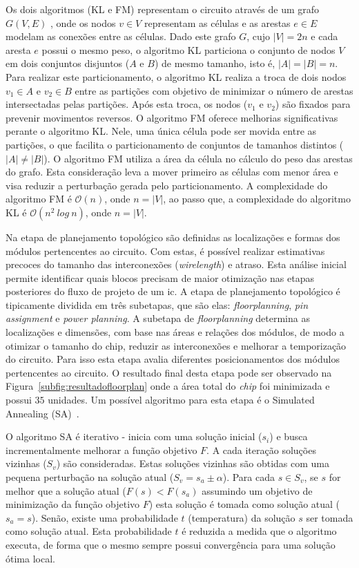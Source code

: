 Os dois algoritmos (KL e FM) representam o circuito através de um grafo $G(V, E)$ , onde os nodos $v \in V$ representam as células e as arestas $e \in E$ modelam as conexões entre as células. Dado este grafo $G$, cujo $|V| = 2n$ e cada aresta $e$ possui o mesmo peso, o algoritmo KL particiona o conjunto de nodos $V$ em dois conjuntos disjuntos ($A$ e $B$) de mesmo tamanho, isto é, $|A| = |B| = n$.
Para realizar este particionamento, o algoritmo KL realiza a troca de dois nodos $v_1 \in A$ e $v_2 \in B$ entre as partições com objetivo de minimizar o número de arestas intersectadas pelas partições. Após esta troca, os nodos ($v_1$ e $v_2$) são fixados para prevenir movimentos reversos.
O algoritmo FM oferece melhorias significativas perante o algoritmo KL. Nele, uma única  célula pode ser movida entre as partições, o que facilita o particionamento de conjuntos de tamanhos distintos ($|A| \neq |B|$).
O algoritmo FM utiliza a área da célula no cálculo do peso das arestas do grafo. Esta consideração leva a mover primeiro as células com menor área e visa reduzir a perturbação gerada pelo particionamento. 
A complexidade do algoritmo FM é $\mathcal{O}(n)$, onde $n = |V|$, ao passo que, a complexidade do algoritmo KL é $\mathcal{O}(n^2~log~n)$, onde $n = |V|$.


Na etapa de planejamento topológico são definidas as localizações e formas dos módulos pertencentes ao circuito.
Com estas, é possível realizar estimativas precoces do tamanho das interconexões (\textit{wirelength}) e atraso. 
Esta análise inicial permite identificar quais blocos precisam de maior otimização nas etapas posteriores do fluxo de projeto de um \ac{ic}. 
A etapa de planejamento topológico é tipicamente dividida em três subetapas, que são elas: \textit{floorplanning}, \textit{pin assignment} e \textit{power planning}.
A subetapa de \textit{floorplanning} determina as localizações e dimensões, com base nas áreas e relações dos módulos, de modo a otimizar o tamanho do chip, reduzir as interconexões e melhorar a temporização do circuito. Para isso esta etapa avalia diferentes posicionamentos dos módulos pertencentes ao circuito.
O resultado final desta etapa pode ser observado na Figura~\ref{subfig:resultadofloorplan} onde a área total do \textit{chip} foi minimizada e possui $35$ unidades.
Um possível algoritmo para esta etapa é o Simulated Annealing (SA)~\cite{russell2009artificial}.

O algoritmo SA é iterativo - inicia com uma solução inicial ($s_i$) e busca incrementalmente melhorar a função objetivo $F$.
A cada iteração soluções vizinhas ($S_v$) são consideradas.
Estas soluções vizinhas são obtidas com uma pequena perturbação na solução atual ($S_v = s_a \pm \alpha$).
Para cada $s \in S_v$, se $s$ for melhor que a solução atual ($F(s) < F(s_a)$ assumindo um objetivo de minimização da função objetivo $F$) esta solução é tomada como solução atual ($s_a = s$).
Senão, existe uma probabilidade $t$ (temperatura) da solução $s$ ser tomada como solução atual. Esta probabilidade $t$ é reduzida a medida que o algoritmo executa, de forma que o mesmo sempre possui convergência para uma solução ótima local.

